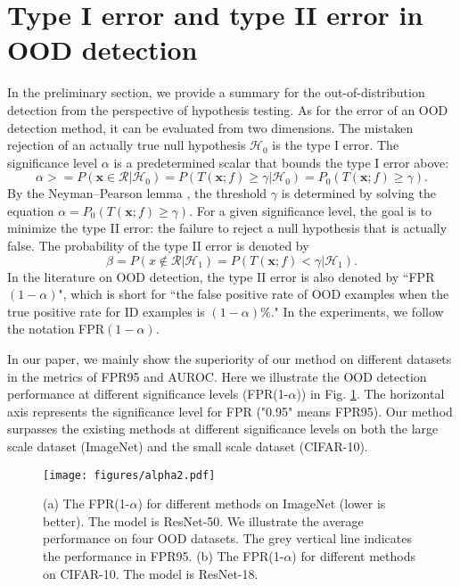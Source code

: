 \documentclass{article}
\newcommand{\cH}{\mathcal H}
\newcommand{\cR}{\mathcal R}
\def\rvx{{\mathbf{x}}}
\begin{document}
\section{Type I error and type II error in OOD detection}\label{App:TypeError}
In the preliminary section, we provide a summary for the out-of-distribution detection from the perspective of hypothesis testing. As for the error of an OOD detection method, it can be evaluated from two dimensions.
The mistaken rejection of an actually true null hypothesis $\cH_0$ is the type I error. 
The significance level $\alpha$ is a predetermined scalar that bounds the type I error above:
\[
\alpha >= P( \rvx \in \cR | \cH_0) = P(T(\rvx;f) \geq \gamma | \cH_0)= P_0(T(\rvx;f) \geq \gamma).
\]
By the Neyman–Pearson lemma \cite{neyman1933ix}, the threshold $\gamma$ is determined by solving the equation $\alpha = P_0(T(\rvx;f) \geq \gamma).$
For a given significance level, the goal is to minimize the type II error: the failure to reject a null hypothesis that is actually false. The probability of the type II error is denoted by
\[
\beta = P( x \notin \cR | \cH_1) = P(T(\rvx;f) < \gamma | \cH_1).
\]
In the literature on OOD detection, the type II error is also denoted by ``FPR$(1-\alpha)$", which is short for ``the false positive rate of OOD examples when the true positive rate for ID examples is $(1-\alpha)\%.$" In the experiments, we follow the notation FPR$(1-\alpha)$. 

In our paper, we mainly show the superiority of our method on different datasets in the metrics of FPR95 and AUROC. Here we illustrate the OOD detection performance at different significance levels (FPR(1-$\alpha$)) in Fig. \ref{img:alpha}. The horizontal axis represents the significance level for FPR ("0.95" means FPR95). Our method surpasses the existing methods at different significance levels on both the large scale dataset (ImageNet) and the small scale dataset (CIFAR-10).
\begin{figure}[htbp]
\centering
\texttt{[image: figures/alpha2.pdf]}
\caption{(a) The FPR(1-$\alpha$) for different methods on ImageNet (lower is better). The model is ResNet-50. We illustrate the average performance on four OOD datasets. The grey vertical line indicates the performance in FPR95. (b) The FPR(1-$\alpha$) for different methods on CIFAR-10. The model is ResNet-18.}
\label{img:alpha}
\end{figure}
\end{document}
